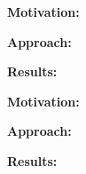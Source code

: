 \conclusionbox{}

\vspace{3mm}
\noindent\rqii
\vspace{3mm}

\noindent \textbf{Motivation:} 

\vspace{1mm}
\noindent \textbf{Approach:} 

\vspace{1mm}
\noindent \textbf{Results:} 

\conclusionbox{}

\vspace{3mm}
\noindent\rqiii
\vspace{3mm}

\noindent \textbf{Motivation:} 

\vspace{1mm}
\noindent \textbf{Approach:} 

\vspace{1mm}
\noindent \textbf{Results:} 

\conclusionbox{}
